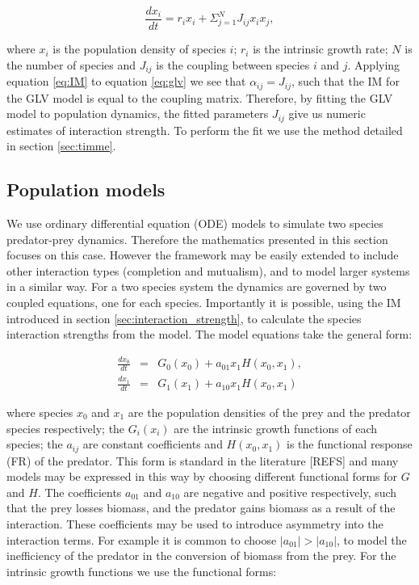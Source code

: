 \begin{equation}
\frac{dx_i}{dt} = r_ix_i + \Sigma_{j=1}^N J_{ij}x_ix_j,
\label{eq:glv}
\end{equation}

where $x_i$ is the population density of species $i$; $r_i$ is the intrinsic growth rate; $N$ is the number of species and $J_{ij}$ is the coupling between species $i$ and $j$. Applying equation \ref{eq:IM} to equation \ref{eq:glv} we see that $\alpha_{ij} = J_{ij}$, such that the IM for the GLV model is equal to the coupling matrix. Therefore, by fitting the GLV model to population dynamics, the fitted parameters $J_{ij}$ give us numeric estimates of interaction strength. To perform the fit we use the method detailed in section \ref{sec:timme}.

\subsection{Population models}
\label{sec:models}


We use ordinary differential equation (ODE) models to simulate two species predator-prey dynamics. Therefore the mathematics presented in this section focuses on this case. However the framework may be easily extended to include other interaction types (completion and mutualism), and to model larger systems in a similar way. For a two species system the dynamics are governed by two coupled equations, one for each species. Importantly it is possible, using the IM introduced in section \ref{sec:interaction_strength}, to calculate the species interaction strengths from the model. The model equations take the general form:

\begin{eqnarray}
\frac{dx_0}{dt} &=& G_{0}(x_0) + a_{01}x_1H(x_0,x_1),  \nonumber \\
\frac{dx_1}{dt} &=& G_{1}(x_1) + a_{10}x_1H(x_0,x_1)
\label{eq:two_species}
\end{eqnarray}

where species $x_0$ and $x_1$ are the population densities of the prey and the predator species respectively; the $G_i(x_i)$ are the intrinsic growth functions of each species; the $a_{ij}$ are constant coefficients and $H(x_0,x_1)$ is the functional response (FR) of the predator. This form is standard in the literature [REFS] and many models may be expressed in this way by choosing different functional forms for $G$ and $H$. The coefficients $a_{01}$ and $a_{10}$ are negative and positive respectively, such that the prey losses biomass, and the predator gains biomass as a result of the interaction. These coefficients may be used to introduce asymmetry into the interaction terms. For example it is common to choose $|a_{01}| > |a_{10}|$, to model the inefficiency of the predator in the conversion of biomass from the prey. For the intrinsic growth functions we use the functional forms:  

